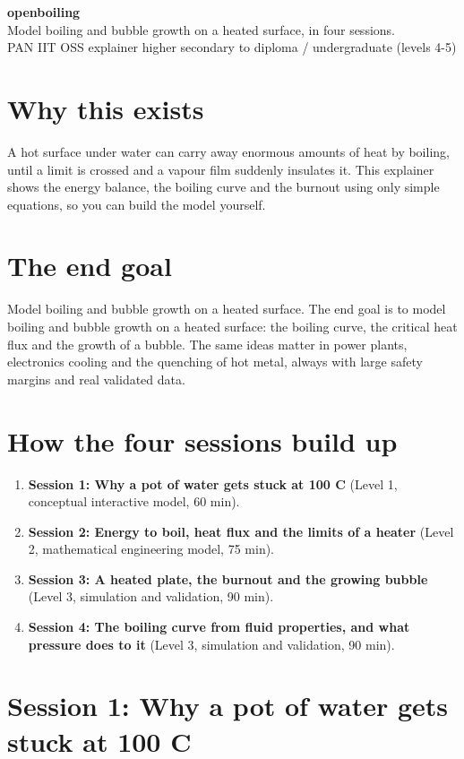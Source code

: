 \documentclass[11pt,a4paper]{article}
\begin{document}
\begin{center}{\LARGE\bfseries openboiling}\\[0.4em]{\large Model boiling and bubble growth on a heated surface, in four sessions.}\\[0.2em]\small PAN IIT OSS explainer \textbullet{} higher secondary to diploma / undergraduate (levels 4-5)\end{center}

\section*{Why this exists}
A hot surface under water can carry away enormous amounts of heat by boiling, until a limit is crossed and a vapour film suddenly insulates it. This explainer shows the energy balance, the boiling curve and the burnout using only simple equations, so you can build the model yourself.

\section*{The end goal}
Model boiling and bubble growth on a heated surface. The end goal is to model boiling and bubble growth on a heated surface: the boiling curve, the critical heat flux and the growth of a bubble. The same ideas matter in power plants, electronics cooling and the quenching of hot metal, always with large safety margins and real validated data.

\section*{How the four sessions build up}
\begin{enumerate}[nosep]
\item \textbf{Session 1: Why a pot of water gets stuck at 100 C} (Level 1, conceptual interactive model, 60 min).
\item \textbf{Session 2: Energy to boil, heat flux and the limits of a heater} (Level 2, mathematical engineering model, 75 min).
\item \textbf{Session 3: A heated plate, the burnout and the growing bubble} (Level 3, simulation and validation, 90 min).
\item \textbf{Session 4: The boiling curve from fluid properties, and what pressure does to it} (Level 3, simulation and validation, 90 min).
\end{enumerate}

\section{Session 1: Why a pot of water gets stuck at 100 C}
\end{document}
